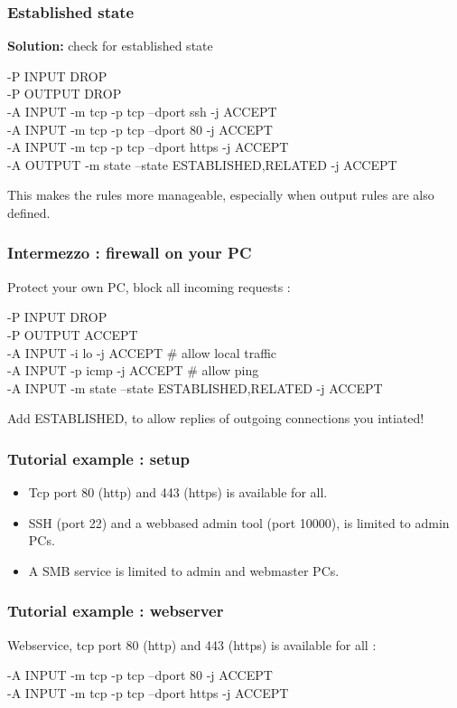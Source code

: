 \documentclass[14pt]{beamer}
\begin{document}
  \begin{frame}
    \frametitle{Established state}
    \textbf{Solution:} check for established state
    \begin{example}
      \small{-P INPUT DROP\\
      -P OUTPUT DROP\\
      -A INPUT -m tcp -p tcp --dport ssh -j ACCEPT\\
      -A INPUT -m tcp -p tcp --dport 80 -j ACCEPT\\
      -A INPUT -m tcp -p tcp --dport https -j ACCEPT\\
      -A OUTPUT -m state --state ESTABLISHED,RELATED -j ACCEPT}
    \end{example}
    This makes the rules more manageable, especially when output rules are also defined.
  \end{frame}
  \begin{frame}
    \frametitle{Intermezzo : firewall on your PC}
    Protect your own PC, block all incoming requests :
    \begin{example}
      \small{-P INPUT DROP\\
      -P OUTPUT ACCEPT}\\
      \pause
      \small{-A INPUT -i lo -j ACCEPT \# allow local traffic\\
      -A INPUT -p icmp -j ACCEPT \# allow ping\\
      -A INPUT -m state --state ESTABLISHED,RELATED -j ACCEPT}
    \end{example}
    Add ESTABLISHED, to allow replies of outgoing connections you intiated!
  \end{frame}
  \begin{frame}
    \frametitle{Tutorial example : setup}
    \begin{itemize}
      \item Tcp port 80 (http) and 443 (https) is available for all.
      \item SSH (port 22) and a webbased admin tool (port 10000), is limited to admin PCs.
      \item A SMB service is limited to admin and webmaster PCs.
    \end{itemize}
  \end{frame}
  \begin{frame}
    \frametitle{Tutorial example : webserver}
    Webservice, tcp port 80 (http) and 443 (https) is available for all :
    \begin{example}
      \small{-A INPUT -m tcp -p tcp --dport 80 -j ACCEPT\\
      -A INPUT -m tcp -p tcp --dport https -j ACCEPT}
    \end{example}
  \end{frame}
\end{document}
